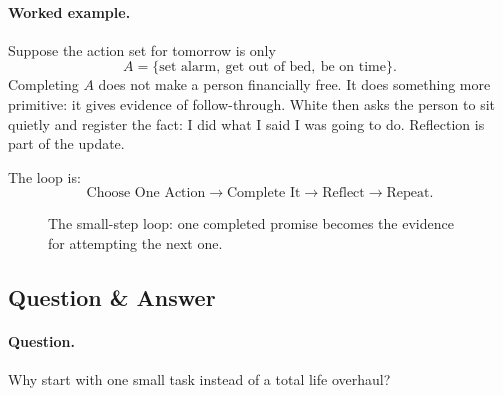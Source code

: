 \paragraph{Worked example.}
Suppose the action set for tomorrow is only
\begin{equation}
A=\{\text{set alarm},\ \text{get out of bed},\ \text{be on time}\}.
\end{equation}
Completing \(A\) does not make a person financially free. It does something more primitive: it gives evidence of follow-through. White then asks the person to sit quietly and register the fact: I did what I said I was going to do. Reflection is part of the update.

The loop is:
\begin{equation}
\text{Choose One Action}
\longrightarrow
\text{Complete It}
\longrightarrow
\text{Reflect}
\longrightarrow
\text{Repeat}.
\end{equation}

\begin{figure}
\centering
{}
\caption{The small-step loop: one completed promise becomes the evidence for attempting the next one.}
\end{figure}

\subsection{Question \& Answer}

\paragraph{Question.}
Why start with one small task instead of a total life overhaul?

